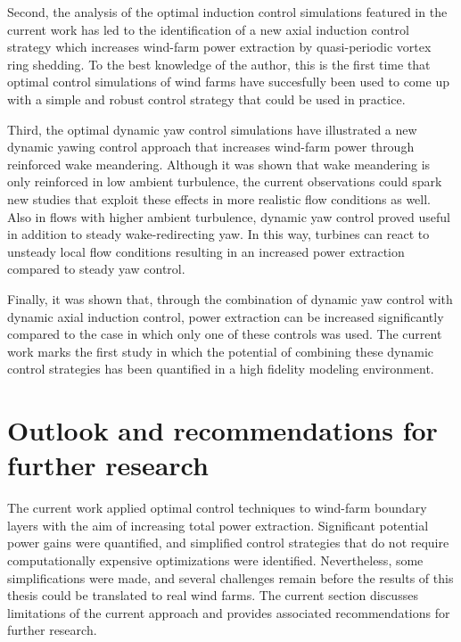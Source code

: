 Second, the analysis of the optimal induction control simulations featured in the current work has led to the identification of a new axial induction control strategy which increases wind-farm power extraction by quasi-periodic vortex ring shedding. To the best knowledge of the author, this is the first time that optimal control simulations of wind farms have succesfully been used to come up with a simple and robust control strategy that could be used in practice.

Third, the optimal dynamic yaw control simulations have illustrated a new dynamic yawing control approach that increases wind-farm power through reinforced wake meandering. Although it was shown that wake meandering is only reinforced in low ambient turbulence, the current observations could spark new studies that exploit these effects in more realistic flow conditions as well. Also in flows with higher ambient turbulence, dynamic yaw control proved useful in addition to steady wake-redirecting yaw. In this way, turbines can react to unsteady local flow conditions resulting in an increased power extraction compared to steady yaw control. 

Finally, it was shown that, through the combination of dynamic yaw control with dynamic axial induction control, power extraction can be increased significantly compared to the case in which only one of these controls was used. The current work marks the first study in which the potential of combining these dynamic control strategies has been quantified in a high fidelity modeling environment. 

\section{Outlook and recommendations for further research}\label{sec:conc_outlook}
The current work applied optimal control techniques to wind-farm boundary layers with the aim of increasing total power extraction. Significant potential power gains were quantified, and simplified control strategies that do not require computationally expensive optimizations were identified. Nevertheless, some simplifications were made, and several challenges remain before the results of this thesis could be translated to real wind farms.  The current section discusses limitations of the current approach and provides associated recommendations for further research. 

